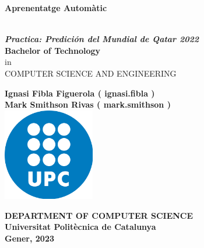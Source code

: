 \thispagestyle{empty}
\begin{center}
    \begin{LARGE}			\bf{Aprenentatge Automàtic\\}
    \end{LARGE}
    \vspace*{25pt}
    
    \textbf{\\
        \it{Practica: Predición del Mundial de Qatar 2022}\\}
        \vspace{20pt}
    \textbf{Bachelor of Technology\\}
    in\\
    \vspace{3pt}
    {COMPUTER SCIENCE AND ENGINEERING}\\
    \vspace{40pt}
    
    \textbf{
        Ignasi Fibla Figuerola ( ignasi.fibla )\\
        Mark Smithson Rivas ( mark.smithson )}\\
    \vspace{30pt}
    \includegraphics[width=0.3\textwidth]{images/logoUPC.png} \\
    \vspace{160pt}
    
    \textbf{DEPARTMENT OF COMPUTER SCIENCE\\
        Universitat Politècnica de Catalunya\\
        Gener, 2023
    }
\end{center}

\newpage